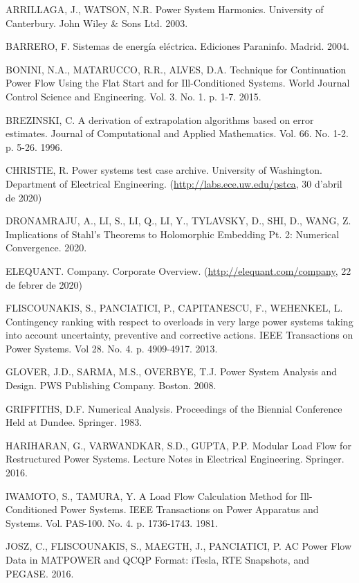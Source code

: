 ARRILLAGA, J., WATSON, N.R. Power System Harmonics. University of Canterbury. John Wiley \& Sons Ltd. 2003. %

BARRERO, F. Sistemas de energía eléctrica. Ediciones Paraninfo. Madrid. 2004.

BONINI, N.A., MATARUCCO, R.R., ALVES, D.A. Technique for Continuation Power Flow Using the Flat Start and for Ill-Conditioned Systems. World Journal Control Science and Engineering. Vol. 3. No. 1. p. 1-7. 2015.

BREZINSKI, C. A derivation of extrapolation algorithms based on error estimates. Journal of Computational and Applied Mathematics. Vol. 66. No. 1-2. p. 5-26. 1996.

CHRISTIE, R. Power systems test case archive. University of Washington. Department of Electrical Engineering. (\url{http://labs.ece.uw.edu/pstca}, 30 d'abril de 2020)

DRONAMRAJU, A., LI, S., LI, Q., LI, Y., TYLAVSKY, D., SHI, D., WANG, Z. Implications of Stahl's Theorems to Holomorphic Embedding Pt. 2: Numerical Convergence. 2020.

ELEQUANT. Company. Corporate Overview. (\url{http://elequant.com/company}, 22 de febrer de 2020)

FLISCOUNAKIS, S., PANCIATICI, P., CAPITANESCU, F., WEHENKEL, L. Contingency ranking with respect to overloads in very large power systems taking into account uncertainty, preventive and corrective actions. IEEE Transactions on Power Systems. Vol 28. No. 4. p. 4909-4917. 2013. %

GLOVER, J.D., SARMA, M.S., OVERBYE, T.J. Power System Analysis and Design. PWS Publishing Company. Boston. 2008. %

GRIFFITHS, D.F. Numerical Analysis. Proceedings of the Biennial Conference Held at Dundee. Springer. 1983.

HARIHARAN, G., VARWANDKAR, S.D., GUPTA, P.P. Modular Load Flow for Restructured Power Systems. Lecture Notes in Electrical Engineering. Springer. 2016. %

IWAMOTO, S., TAMURA, Y. A Load Flow Calculation Method for Ill-Conditioned Power Systems. IEEE Transactions on Power Apparatus and Systems. Vol. PAS-100. No. 4. p. 1736-1743. 1981.

JOSZ, C., FLISCOUNAKIS, S., MAEGTH, J., PANCIATICI, P. AC Power Flow Data in MATPOWER and QCQP Format: iTesla, RTE Snapshots, and PEGASE. 2016. %

